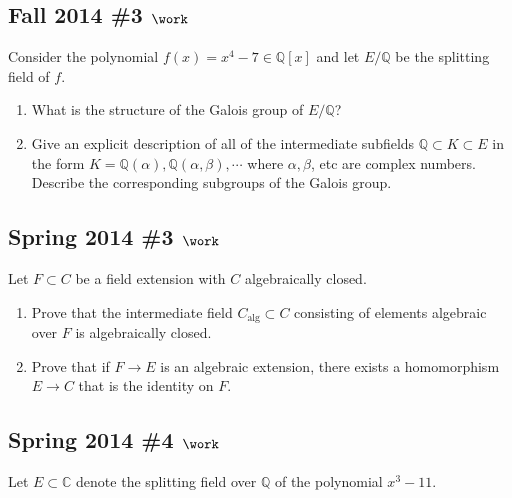 \hypertarget{fall-2014-3-work}{%
\subsection{\texorpdfstring{Fall 2014 \#3
\(\work\)}{Fall 2014 \#3 \textbackslash work}}\label{fall-2014-3-work}}

Consider the polynomial \(f(x) = x^4 - 7 \in {\mathbb{Q}}[x]\) and let
\(E/{\mathbb{Q}}\) be the splitting field of \(f\).

\begin{enumerate}
\def\labelenumi{\alph{enumi}.}
\item
  What is the structure of the Galois group of \(E/{\mathbb{Q}}\)?
\item
  Give an explicit description of all of the intermediate subfields
  \({\mathbb{Q}}\subset K \subset E\) in the form
  \(K = {\mathbb{Q}}(\alpha), {\mathbb{Q}}(\alpha, \beta), \cdots\)
  where \(\alpha, \beta\), etc are complex numbers. Describe the
  corresponding subgroups of the Galois group.
\end{enumerate}

\hypertarget{spring-2014-3-work}{%
\subsection{\texorpdfstring{Spring 2014 \#3
\(\work\)}{Spring 2014 \#3 \textbackslash work}}\label{spring-2014-3-work}}

Let \(F\subset C\) be a field extension with \(C\) algebraically closed.

\begin{enumerate}
\def\labelenumi{\alph{enumi}.}
\item
  Prove that the intermediate field \(C_{\text{alg}} \subset C\)
  consisting of elements algebraic over \(F\) is algebraically closed.
\item
  Prove that if \(F\to E\) is an algebraic extension, there exists a
  homomorphism \(E\to C\) that is the identity on \(F\).
\end{enumerate}

\hypertarget{spring-2014-4-work}{%
\subsection{\texorpdfstring{Spring 2014 \#4
\(\work\)}{Spring 2014 \#4 \textbackslash work}}\label{spring-2014-4-work}}

Let \(E\subset {\mathbb{C}}\) denote the splitting field over
\({\mathbb{Q}}\) of the polynomial \(x^3 - 11\).

